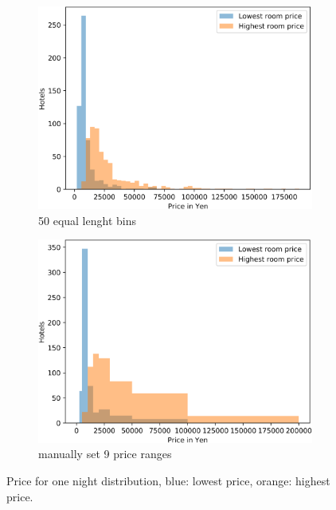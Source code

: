\documentclass[smallextended,natbib]{svjour3}       %
\begin{document}
    \begin{figure}[ht]
        \centering
        \begin{subfigure}[b]{0.45\textwidth}
            \includegraphics[width=\textwidth]{price_range_distribution_50_even_bins.png}
            \caption{50 equal lenght bins}
        \end{subfigure}
        \begin{subfigure}[b]{0.45\textwidth}
            \includegraphics[width=\textwidth]{price_range_distribution_bins_ver_2.png}
            \caption{manually set 9 price ranges}
        \end{subfigure}
    \caption{Price for one night distribution, blue: lowest price, orange: highest price.}
    \label{fig:price_dist}
    \end{figure}
\end{document}
